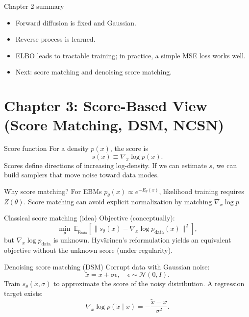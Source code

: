 \documentclass[aspectratio=169]{beamer}
\begin{document}
\begin{frame}{Chapter 2 summary}
\begin{itemize}
\item Forward diffusion is fixed and Gaussian.
\item Reverse process is learned.
\item ELBO leads to tractable training; in practice, a simple MSE loss works well.
\item Next: score matching and denoising score matching.
\end{itemize}
\end{frame}

\section{Chapter 3: Score-Based View (Score Matching, DSM, NCSN)}

\begin{frame}{Score function}
For a density \(p(x)\), the score is
\[
s(x)\equiv \nabla_x \log p(x).
\]
Scores define directions of increasing log-density.
If we can estimate \(s\), we can build samplers that move noise toward data modes.
\end{frame}

\begin{frame}{Why score matching?}
For EBMs \(p_\theta(x)\propto e^{-E_\theta(x)}\), likelihood training requires \(Z(\theta)\).
Score matching can avoid explicit normalization by matching \(\nabla_x\log p\).
\end{frame}

\begin{frame}{Classical score matching (idea)}
Objective (conceptually):
\[
\min_\theta \ \mathbb{E}_{p_{\text{data}}}\left[\|s_\theta(x)-\nabla_x\log p_{\text{data}}(x)\|^2\right],
\]
but \(\nabla_x\log p_{\text{data}}\) is unknown.
Hyv\"arinen's reformulation yields an equivalent objective without the unknown score (under regularity).
\end{frame}

\begin{frame}{Denoising score matching (DSM)}
Corrupt data with Gaussian noise:
\[
\tilde x = x + \sigma \epsilon,\quad \epsilon\sim \mathcal{N}(0,I).
\]
Train \(s_\theta(\tilde x,\sigma)\) to approximate the score of the noisy distribution.
A regression target exists:
\[
\nabla_{\tilde x}\log p(\tilde x\mid x) = -\frac{\tilde x-x}{\sigma^2}.
\]
\end{frame}
\end{document}
